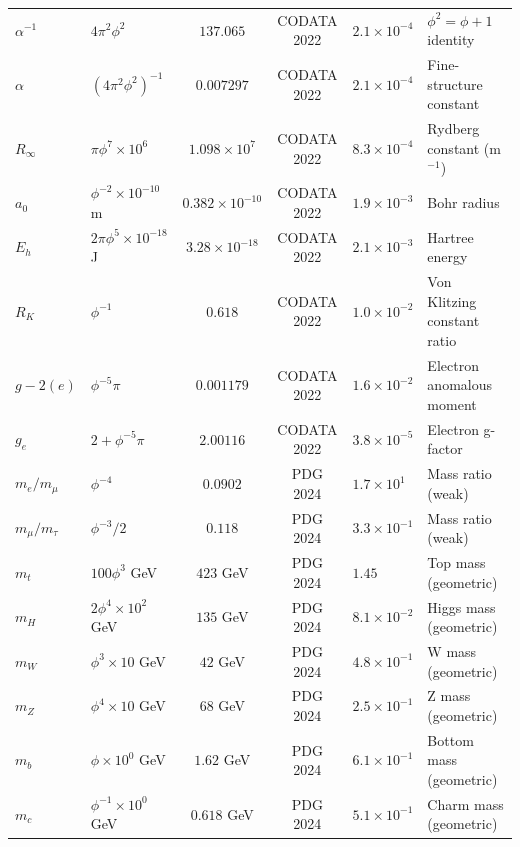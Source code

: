 \begin{longtable}{p{3.5cm}p{4cm}ccp{2cm}p{3cm}}
$\alpha^{-1}$ & $4\pi^2\phi^2$ & $137.065$ & CODATA 2022 & $2.1\times10^{-4}$ & $\phi^2 = \phi + 1$ identity \\
$\alpha$ & $(4\pi^2\phi^2)^{-1}$ & $0.007297$ & CODATA 2022 & $2.1\times10^{-4}$ & Fine-structure constant \\
$R_\infty$ & $\pi\phi^7\times10^6$ & $1.098\times10^7$ & CODATA 2022 & $8.3\times10^{-4}$ & Rydberg constant (m$^{-1}$) \\
$a_0$ & $\phi^{-2}\times10^{-10}$ m & $0.382\times10^{-10}$ & CODATA 2022 & $1.9\times10^{-3}$ & Bohr radius \\
$E_h$ & $2\pi\phi^5\times10^{-18}$ J & $3.28\times10^{-18}$ & CODATA 2022 & $2.1\times10^{-3}$ & Hartree energy \\
$R_K$ & $\phi^{-1}$ & $0.618$ & CODATA 2022 & $1.0\times10^{-2}$ & Von Klitzing constant ratio \\
$g-2(e)$ & $\phi^{-5}\pi$ & $0.001179$ & CODATA 2022 & $1.6\times10^{-2}$ & Electron anomalous moment \\
$g_e$ & $2 + \phi^{-5}\pi$ & $2.00116$ & CODATA 2022 & $3.8\times10^{-5}$ & Electron g-factor \\

$m_e/m_\mu$ & $\phi^{-4}$ & $0.0902$ & PDG 2024 & $1.7\times10^{1}$ & Mass ratio (weak) \\
$m_\mu/m_\tau$ & $\phi^{-3}/2$ & $0.118$ & PDG 2024 & $3.3\times10^{-1}$ & Mass ratio (weak) \\
$m_t$ & $100\phi^3$ GeV & $423$ GeV & PDG 2024 & $1.45$ & Top mass (geometric) \\
$m_H$ & $2\phi^4 \times 10^2$ GeV & $135$ GeV & PDG 2024 & $8.1\times10^{-2}$ & Higgs mass (geometric) \\
$m_W$ & $\phi^3\times10$ GeV & $42$ GeV & PDG 2024 & $4.8\times10^{-1}$ & W mass (geometric) \\
$m_Z$ & $\phi^4\times10$ GeV & $68$ GeV & PDG 2024 & $2.5\times10^{-1}$ & Z mass (geometric) \\
$m_b$ & $\phi\times10^0$ GeV & $1.62$ GeV & PDG 2024 & $6.1\times10^{-1}$ & Bottom mass (geometric) \\
$m_c$ & $\phi^{-1}\times10^0$ GeV & $0.618$ GeV & PDG 2024 & $5.1\times10^{-1}$ & Charm mass (geometric) \\


\end{longtable}
